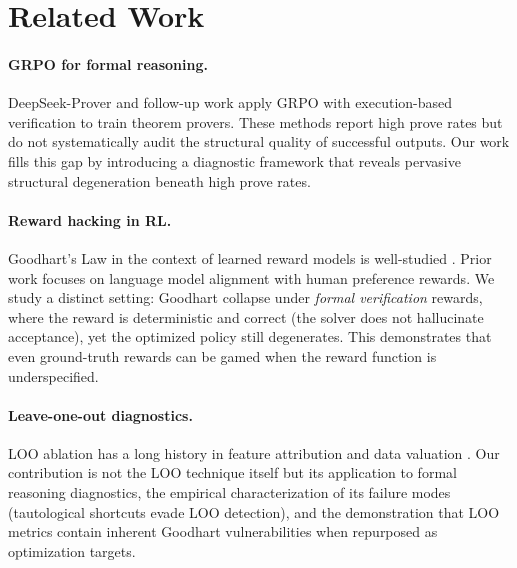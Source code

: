 \documentclass[11pt,a4paper]{article}
\begin{document}
\section{Related Work}

\paragraph{GRPO for formal reasoning.}
DeepSeek-Prover \citep{shao2024deepseekprover} and follow-up work \citep{xin2024deepseekproverv15} apply GRPO with execution-based verification to train theorem provers.
These methods report high prove rates but do not systematically audit the structural quality of successful outputs.
Our work fills this gap by introducing a diagnostic framework that reveals pervasive structural degeneration beneath high prove rates.

\paragraph{Reward hacking in RL.}
Goodhart's Law in the context of learned reward models is well-studied \citep{gao2023scaling,skalse2022defining}.
Prior work focuses on language model alignment with human preference rewards.
We study a distinct setting: Goodhart collapse under \emph{formal verification} rewards, where the reward is deterministic and correct (the solver does not hallucinate acceptance), yet the optimized policy still degenerates.
This demonstrates that even ground-truth rewards can be gamed when the reward function is underspecified.

\paragraph{Leave-one-out diagnostics.}
LOO ablation has a long history in feature attribution \citep{zeiler2014visualizing} and data valuation \citep{ghorbani2019data}.
Our contribution is not the LOO technique itself but its application to formal reasoning diagnostics, the empirical characterization of its failure modes (tautological shortcuts evade LOO detection), and the demonstration that LOO metrics contain inherent Goodhart vulnerabilities when repurposed as optimization targets.

\end{document}
